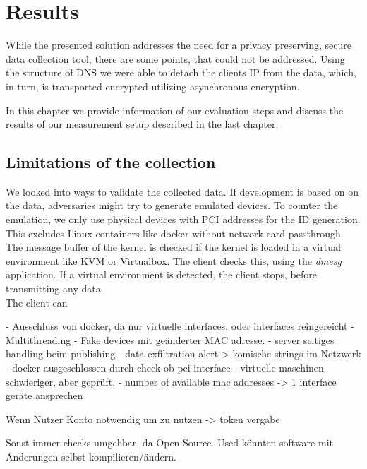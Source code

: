 \chapter{Results}
\label{chap:results}

While the presented solution addresses the need for a privacy preserving, secure data collection tool, there are some points, that could not be addressed. 
Using the structure of DNS we were able to detach the clients IP from the data, which, in turn, is transported encrypted utilizing asynchronous encryption. 

In this chapter we provide information of our evaluation steps and discuss the results of our measurement setup described in the last chapter.\\

\section{Limitations of the collection}
\label{sec:measurement:robust}
%

    We looked into ways to validate the collected data. If development is based on on the data, adversaries might try to generate emulated devices. To counter the emulation, we only use physical devices with PCI addresses for the ID generation. This excludes Linux containers like docker without network card passthrough. The message buffer of the kernel is checked if the kernel is loaded in a virtual environment like KVM or Virtualbox. The client checks this, using the \textit{dmesg} application. 
    If a virtual environment is detected, the client stops, before transmitting any data.\\
    The client can 



- Ausschluss von docker, da nur virtuelle interfaces, oder interfaces reingereicht
- Multithreading
- Fake devices mit geänderter MAC adresse.
- server seitiges handling beim publishing
- data exfiltration alert-> komische strings im Netzwerk
- docker ausgeschlossen durch check ob pci interface
- virtuelle maschinen schwieriger, aber geprüft.
- number of available mac addresses -> 1 interface geräte ansprechen

Wenn Nutzer Konto notwendig um zu nutzen -> token vergabe

Sonst immer checks umgehbar, da Open Source. Used könnten software mit Änderungen selbst kompilieren/ändern.

